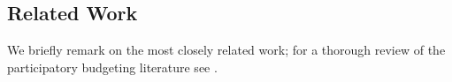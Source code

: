 \documentclass[runningheads]{llncs}
\newcommand{\mes}{ES}
\begin{document}



\subsection{Related Work}\label{sec:related}
We briefly remark on the most closely related work; for a thorough review of the participatory budgeting literature see \citet{aziz2021participatory}.
\end{document}
